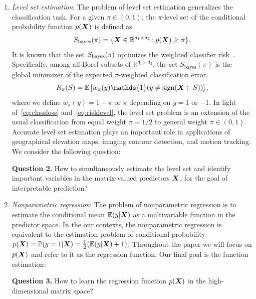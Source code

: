 \documentclass[11pt]{article}
\theoremstyle{definition}
\def\sign{\textup{sign}}
\def\bayesS{S_{\textup{bayes}}}
\begin{document}
\begin{enumerate}[label={2.\arabic*},wide, labelwidth=!, labelindent=0pt]
\item {\it Level set estimation}: The problem of level set estimation generalizes the classification task. 
For a given $\pi\in(0, 1)$, the $\pi$-level set of the conditional probability function $p(\bm X)$ is defined as
\begin{equation}\label{eq:level}
\bayesS(\pi) = \{\mX\in\mathbb{R}^{d_1\times d_2}\colon p(\mX)\geq \pi\}.
\end{equation}
It is known that  the set $\bayesS(\pi)$ optimizes the weighted classifier risk~\citep{willett2007minimax,scott2007regression,wang2008probability}. Specifically, among all Borel subsets of $\mathbb{R}^{d_1\times d_2}$, the set $S_{\text{bayes}}(\pi)$ is the global minimizer of the expected $\pi$-weighted classification error,
\begin{equation}\label{eq:risklevel}
R_\pi(S)=\mathbb{E}\left[ w_{\pi}(y)\mathds{1}(y\neq \sign(\mX\in S))\right],
\end{equation}
where we define $w_{\pi}(y)=1-\pi$ or $\pi$ depending on $y=1$ or $-1$. In light of~\eqref{eq:classloss} and~\eqref{eq:risklevel}, the level set problem is an extension of the usual classification from equal weight $\pi=1/2$ to general weight $\pi \in(0,1)$. Accurate level set estimation plays an important role in applications of geographical elevation maps, imaging contour detection, and motion tracking. We consider the following question:

{\bf Question 2.} How to simultaneously estimate the level set and identify important variables in the matrix-valued predictors $\bm X$, for the goal of interpretable prediction?


\item {\it Nonparametric regression}: The problem of nonparametric regression is to estimate the conditional mean $\mathbb{E}(y|\bm X)$ as a multivariable function in the predictor space. In the our contexts, the nonparametric regression is equivalent to the estimation problem of conditional probability $p(\bm X)=\mathbb{P}(y=1|\bm X)=\frac{1}{2}(\mathbb{E}(y|\bm X)+1)$. Throughout the paper we will focus on $p(\bm X)$ and refer to it as the regression function. Our final goal is the function estimation:

{\bf Question 3.} How to learn the regression function $p(\bm X)$ in the high-dimensional matrix space?
\end{enumerate}
\end{document}
